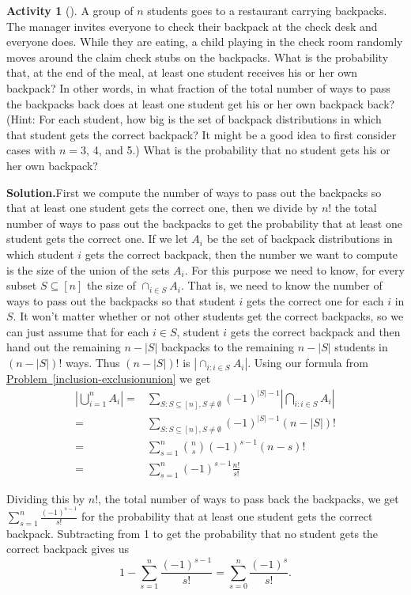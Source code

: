 \documentclass[10pt,]{book}
\theoremstyle{plain}
\theoremstyle{definition}
\newtheorem{activity}[project]{Activity}
\numberwithin{equation}{chapter}
\newcommand{\amp}{&}
\begin{document}
\begin{activity}[]\label{hatcheck}
A group of \(n\) students goes to a restaurant carrying backpacks. The manager invites everyone to check their backpack at the check desk and everyone does. While they are eating, a child playing in the check room randomly moves around the claim check stubs on the backpacks. What is the probability that, at the end of the meal, at least one student receives his or her own backpack? In other words, in what fraction of the total number of ways to pass the backpacks back does at least one student get his or her own backpack back? (Hint: For each student, how big is the set of backpack distributions in which that student gets the correct backpack? It might be a good idea to first consider cases with \(n=3\), 4, and 5.) What is the probability that no student gets his or her own backpack?%
\par\medskip\noindent%
\textbf{Solution.}\quad First we compute the number of ways to pass out the backpacks so that at least one student gets the correct one, then we divide by \(n!\) the total number of ways to pass out the backpacks to get the probability that at least one student gets the correct one. If we let \(A_i\) be the set of backpack distributions in which student \(i\) gets the correct backpack, then the number we want to compute is the size of the union of the sets \(A_i\). For this purpose we need to know, for every subset \(S\subseteq [n]\) the size of \(\cap_{i\in S}A_i\). That is, we need to know the number of ways to pass out the backpacks so that student \(i\) gets the correct one for each \(i\) in \(S\). It won't matter whether or not other students get the correct backpacks, so we can just assume that for each \(i\in S\), student \(i\) gets the correct backpack and then hand out the remaining \(n-|S|\) backpacks to the remaining \(n-|S|\) students in \((n-|S|)!\) ways. Thus \((n-|S|)!\) is \(|\cap_{i:i\in S}A_i|\). Using our formula from \hyperref[inclusion-exclusionunion]{Problem~\ref{inclusion-exclusionunion}} we get%
\begin{align*}
\left|\bigcup_{i=1}^n A_i \right|  =\amp  \sum_{S:
S\subseteq [n], S\not=\emptyset}
(-1)^{|S|-1}\left|\bigcap_{i:i\in S} A_i \right|\\
=\amp \sum_{S:
S\subseteq [n], S\not=\emptyset}(-1)^{|S|-1} (n-|S|)!\\
=\amp
\sum_{s=1}^n \binom{n}{s}(-1)^{s-1}(n-s)!\\
=\amp \sum_{s=1}^n
(-1)^{s-1}\frac{n!}{s!}
\end{align*}
%
\par
Dividing this by \(n!\), the total number of ways to pass back the backpacks, we get \(\displaystyle \sum_{s=1}^n \frac{(-1)^{s-1}}{s!}\) for the probability that at least one student gets the correct backpack. Subtracting from 1 to get the probability that no student gets the correct backpack gives us%
\begin{equation*}
1- \sum_{s=1}^n \frac{(-1)^{s-1}}{s!}=\sum_{s=0}^n\frac{(-1)^s}{s!}.
\end{equation*}
%
\end{activity}
\end{document}
